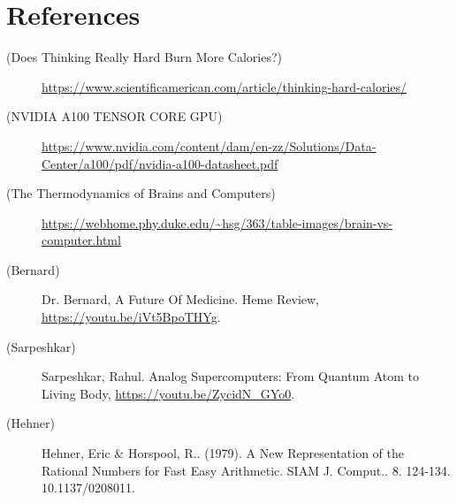 \newpage
\section*{References}

\newcommand{\source}[2]{
\item [({#1})]{#2}
}

\begin{description}
\source{Does Thinking Really Hard Burn More Calories?}{\url{https://www.scientificamerican.com/article/thinking-hard-calories/}}
\source{NVIDIA A100
TENSOR CORE GPU}{\url{https://www.nvidia.com/content/dam/en-zz/Solutions/Data-Center/a100/pdf/nvidia-a100-datasheet.pdf}}
\source{The Thermodynamics of Brains and Computers}{\url{https://webhome.phy.duke.edu/~hsg/363/table-images/brain-vs-computer.html}}
\source{Bernard}{Dr. Bernard, A Future Of Medicine. Heme Review, \url{https://youtu.be/iVt5BpoTHYg}.}
\source{Sarpeshkar}{Sarpeshkar, Rahul. Analog Supercomputers: From Quantum Atom to Living Body, \url{https://youtu.be/ZycidN_GYo0}.}
\source{Hehner}{Hehner, Eric \& Horspool, R.. (1979). A New Representation of the Rational Numbers for Fast Easy Arithmetic. SIAM J. Comput.. 8. 124-134. 10.1137/0208011. }
\end{description}


